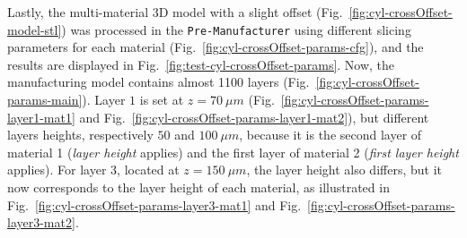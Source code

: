 Lastly, the multi-material 3D model with a slight offset
(Fig.~\ref{fig:cyl-crossOffset-model-stl}) was processed in the
\texttt{Pre-Manufacturer} using different slicing parameters for each material
(Fig.~\ref{fig:cyl-crossOffset-params-cfg}), and the results are
displayed in Fig.~\ref{fig:test-cyl-crossOffset-params}.
Now, the manufacturing model contains almost 1100 layers
(Fig.~\ref{fig:cyl-crossOffset-params-main}).
Layer
$1$ is set at $z = 70~\mu m$ (Fig.~\ref{fig:cyl-crossOffset-params-layer1-mat1}
and Fig.~\ref{fig:cyl-crossOffset-params-layer1-mat2}), but different layers
heights, respectively $50$ and $100~\mu m$, because it is the second layer of
material 1 (\emph{layer height} applies) and the first layer of material 2
(\emph{first layer height} applies).
%
For layer 3, located at $z = 150~\mu m$, the layer height also differs, but it
now corresponds to the layer height of each material, as illustrated in
Fig.~\ref{fig:cyl-crossOffset-params-layer3-mat1} and
Fig.~\ref{fig:cyl-crossOffset-params-layer3-mat2}.

